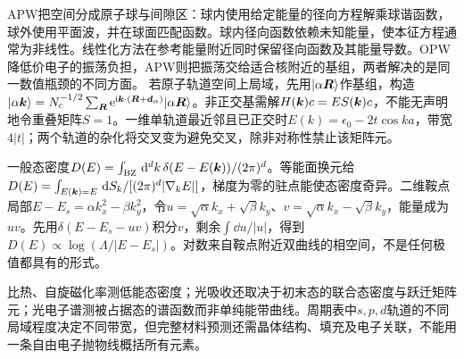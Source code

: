 APW把空间分成原子球与间隙区：球内使用给定能量的径向方程解乘球谐函数，球外使用平面波，并在球面匹配函数。球内径向函数依赖未知能量，使本征方程通常为非线性。线性化方法在参考能量附近同时保留径向函数及其能量导数。OPW降低价电子的振荡负担，APW则把振荡交给适合核附近的基组，两者解决的是同一数值瓶颈的不同方面。
若原子轨道空间上局域，先用$\lvert \alpha\boldsymbol{R}\rangle$作基组，构造$\lvert \alpha\boldsymbol{k}\rangle=N_c^{-1/2}\sum_{\boldsymbol{R}}\mathrm e^{\mathrm i\boldsymbol{k}\cdot(\boldsymbol{R}+\boldsymbol{d}_\alpha)}\lvert \alpha\boldsymbol{R}\rangle$。非正交基需解$H(\boldsymbol{k})c=ES(\boldsymbol{k})c$，不能无声明地令重叠矩阵$S=1$。一维单轨道最近邻且已正交时$E(k)=\epsilon_0-2t\cos ka$，带宽$4|t|$；两个轨道的杂化将交叉变为避免交叉，除非对称性禁止该矩阵元。

一般态密度$D(E)=\int_{\mathrm{BZ}}\,\mathrm d^dk\,\delta(E-E(\boldsymbol{k}))/(2\pi)^d$。等能面换元给$D(E)=\int_{E(\boldsymbol{k})=E}\,\mathrm d S_k/[(2\pi)^d|\nabla_kE|]$，梯度为零的驻点能使态密度奇异。二维鞍点局部$E-E_s=\alpha k_x^2-\beta k_y^2$，令$u=\sqrt\alpha k_x+\sqrt\beta k_y$、$v=\sqrt\alpha k_x-\sqrt\beta k_y$，能量成为$uv$。先用$\delta(E-E_s-uv)$积分$v$，剩余$\int\dd u/|u|$，得到$D(E)\propto\log(\Lambda/|E-E_s|)$。对数来自鞍点附近双曲线的相空间，不是任何极值都具有的形式。

\begin{center}
\end{center}
比热、自旋磁化率测低能态密度；光吸收还取决于初末态的联合态密度与跃迁矩阵元；光电子谱测被占据态的谱函数而非单纯能带曲线。周期表中$s,p,d$轨道的不同局域程度决定不同带宽，但完整材料预测还需晶体结构、填充及电子关联，不能用一条自由电子抛物线概括所有元素。
